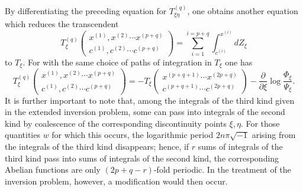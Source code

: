 \documentclass[10pt]{article}
\begin{document}
By differentiating the preceding equation for \(T_{\xi\eta}^{(q)}\), one obtains another equation which reduces the transcendent
\[
T_{\xi}^{(q)}\begin{pmatrix}x^{(1)},x^{(2)}\cdots x^{(p+q)}\\c^{(1)},c^{(2)}\cdots c^{(p+q)}\end{pmatrix}
=\sum_{i=1}^{i=p+q}\int_{c^{(i)}}^{x^{(i)}}dZ_\xi
\]
to \(T_\xi\). For with the same choice of paths of integration in \(T_\xi\) one has
\[
T_\xi^{(q)}\begin{pmatrix}x^{(1)},x^{(2)}\cdots x^{(p+q)}\\c^{(1)},c^{(2)}\cdots c^{(p+q)}\end{pmatrix}
=-T_\xi\begin{pmatrix}x^{(p+q+1)}\cdots x^{(2p+q)}\\c^{(p+q+1)}\cdots c^{(2p+q)}\end{pmatrix}
-\frac{\partial}{\partial\xi}\log\frac{\Phi_\xi}{\Psi_\xi}.
\]
It is further important to note that, among the integrals of the third kind given in the extended inversion problem, some can pass into integrals of the second kind by coalescence of the corresponding discontinuity points \(\xi,\eta\). For those quantities \(w\) for which this occurs, the logarithmic period \(2n\pi\sqrt{-1}\) arising from the integrals of the third kind disappears; hence, if \(r\) sums of integrals of the third kind pass into sums of integrals of the second kind, the corresponding Abelian functions are only \((2p+q-r)\)-fold periodic. In the treatment of the inversion problem, however, a modification would then occur.
\end{document}
